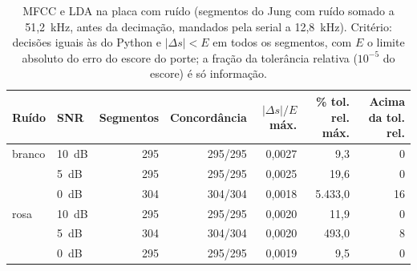 \begin{table}[H]
\centering
\caption{MFCC e LDA na placa com ruído (segmentos do Jung com ruído somado a 51,2~kHz, antes da decimação, mandados pela serial a 12,8~kHz). Critério: decisões iguais às do Python e $|\Delta s| < E$ em todos os segmentos, com $E$ o limite absoluto do erro do escore do porte; a fração da tolerância relativa ($10^{-5}$ do escore) é só informação.}
\label{tab:serial_placa_ruido}
\small
\begin{tabular}{llrrrrr}
\toprule
\textbf{Ruído} & \textbf{SNR} & \textbf{Segmentos} & \textbf{Concordância} & \textbf{$|\Delta s|/E$ máx.} & \textbf{\% tol. rel. máx.} & \textbf{Acima da tol. rel.} \\
\midrule
branco & 10~dB & 295 & 295/295 & 0,0027 & 9,3 & 0 \\
 & 5~dB & 295 & 295/295 & 0,0025 & 19,6 & 0 \\
 & 0~dB & 304 & 304/304 & 0,0018 & 5.433,0 & 16 \\
\midrule
rosa & 10~dB & 295 & 295/295 & 0,0020 & 11,9 & 0 \\
 & 5~dB & 304 & 304/304 & 0,0020 & 493,0 & 8 \\
 & 0~dB & 295 & 295/295 & 0,0019 & 9,5 & 0 \\
\bottomrule
\end{tabular}
\end{table}
